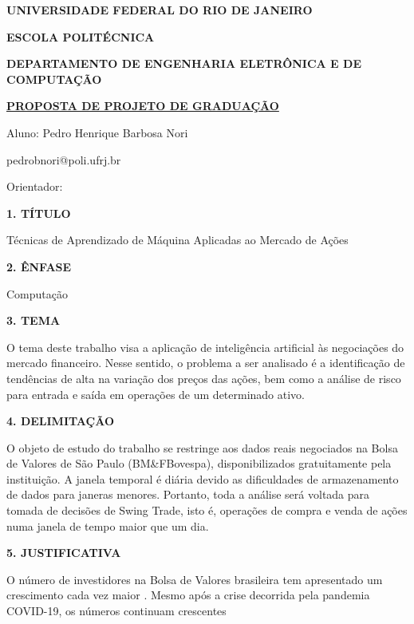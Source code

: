 \documentclass[a4paper,12pt,oneside,openany]{report}
\begin{document}
\begin{center}
\textbf{UNIVERSIDADE FEDERAL DO RIO DE JANEIRO}
\vspace{-0.2cm}

\textbf{ESCOLA POLITÉCNICA}
\vspace{-0.2cm}

\textbf{DEPARTAMENTO DE ENGENHARIA ELETRÔNICA E DE COMPUTAÇÃO}
\vspace{0.8cm}

\underline{\textbf{PROPOSTA DE PROJETO DE GRADUAÇÃO}}

Aluno: Pedro Henrique Barbosa Nori
\vspace{-0.2cm}

pedrobnori@poli.ufrj.br

Orientador:
\end{center}

\textbf{1. TÍTULO}

	Técnicas de Aprendizado de Máquina Aplicadas ao Mercado de Ações

\vspace{0.4cm}
\textbf{2. ÊNFASE}

Computação

\vspace{0.4cm}
\textbf{3. TEMA}

O tema deste trabalho visa a aplicação de inteligência artificial às negociações do mercado financeiro. Nesse sentido, o problema a ser analisado é a identificação de tendências de alta na variação dos preços das ações, bem como a análise de risco para entrada e saída em operações de um determinado ativo.

\vspace{0.4cm}
\textbf{4. DELIMITAÇÃO}

O objeto de estudo do trabalho se restringe aos dados reais negociados na Bolsa de Valores de São Paulo (BM\&FBovespa), disponibilizados gratuitamente pela instituição. A janela temporal é diária devido as dificuldades de armazenamento de dados para janeras menores. Portanto, toda a análise será voltada para tomada de decisões de Swing Trade, isto é, operações de compra e venda de ações numa janela de tempo maior que um dia.

\vspace{0.4cm}
\textbf{5. JUSTIFICATIVA}

O número de investidores na Bolsa de Valores brasileira tem apresentado um crescimento cada vez 
maior \cite{historicopf}. 
Mesmo após a crise decorrida pela pandemia COVID-19, os números continuam crescentes
\end{document}
